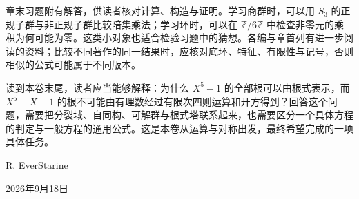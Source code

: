 \ProseParagraphBreak
章末习题附有解答，供读者核对计算、构造与证明。学习商群时，可以用 \(S_3\) 的正规子群与非正规子群比较陪集乘法；学习环时，可以在 \(\mathbb Z/6\mathbb Z\) 中检查非零元的乘积为何可能为零。这类小对象也适合检验习题中的猜想。各编与章首列有进一步阅读的资料；比较不同著作的同一结果时，应核对底环、特征、有限性与记号，否则相似的公式可能属于不同版本。

\ProseParagraphBreak
读到本卷末尾，读者应当能够解释：为什么 \(X^5-1\) 的全部根可以由根式表示，而 \(X^5-X-1\) 的根不可能由有理数经过有限次四则运算和开方得到？回答这个问题，需要把分裂域、自同构、可解群与根式塔联系起来，也需要区分一个具体方程的判定与一般方程的通用公式。这是本卷从运算与对称出发，最终希望完成的一项具体任务。

\bigskip
\begin{flushright}
	R. EverStarine

	2026年9月18日
\end{flushright}
